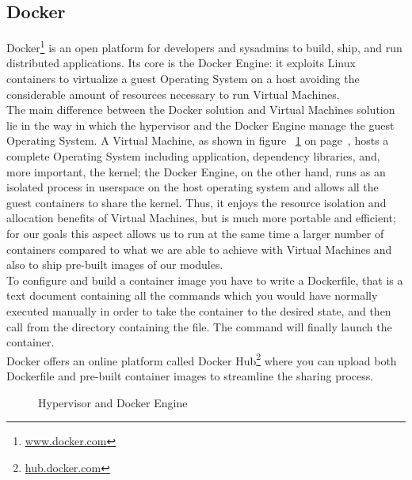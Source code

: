 \subsection{Docker}
\label{sub:sota_docker}
Docker\footnote{\url{www.docker.com}} is an open platform for developers and sysadmins to build, ship, and run distributed applications. Its core is the Docker Engine: it exploits Linux containers to virtualize a guest Operating System on a host avoiding the considerable amount of resources necessary to run Virtual Machines.\\
The main difference between the Docker solution and Virtual Machines solution lie in the way in which the hypervisor and the Docker Engine manage the guest Operating System. A Virtual Machine, as shown in figure ~\ref{fig:docker_vm} on page~\pageref{fig:docker_vm}, hosts a complete Operating System including application, dependency libraries, and, more important, the kernel; the Docker Engine, on the other hand, runs as an isolated process in userspace on the host operating system and allows all the guest containers to share the kernel. Thus, it enjoys the resource isolation and allocation benefits of Virtual Machines, but is much more portable and efficient; for our goals this aspect allows us to run at the same time a larger number of containers compared to what we are able to achieve with Virtual Machines and also to ship pre-built images of our modules.\\
To configure and build a container image you have to write a Dockerfile, that is a text document containing all the commands which you would have normally executed manually in order to take the container to the desired state, and then call  from the directory containing the file. The command  will finally launch the container.\\
Docker offers an online platform called Docker Hub\footnote{\url{hub.docker.com}} where you can upload both Dockerfile and pre-built container images to streamline the sharing process.
    
\begin{figure}[!ht]
\label{fig:docker_vm}
\caption{Hypervisor and Docker Engine}
\end{figure}

